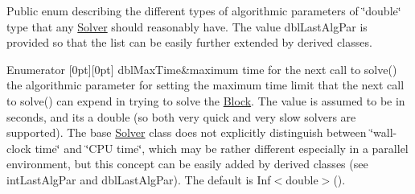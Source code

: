 Public enum describing the different types of algorithmic parameters of \char`\"{}double\char`\"{} type that any \mbox{\hyperlink{class_s_m_spp__di__unipi__it_1_1_solver}{Solver}} should reasonably have. The value dbl\+Last\+Alg\+Par is provided so that the list can be easily further extended by derived classes. \begin{DoxyEnumFields}{Enumerator}
[0pt][0pt]{}\mbox{\label{class_s_m_spp__di__unipi__it_1_1_solver_ace6215148d1e3c41a8844f6d692ee132acd77e71bf86e7d641a5e571a18efae5a}} 
dbl\+Max\+Time&maximum time for the next call to solve() the algorithmic parameter for setting the maximum time limit that the next call to solve() can expend in trying to solve the \mbox{\hyperlink{class_s_m_spp__di__unipi__it_1_1_block}{Block}}. The value is assumed to be in seconds, and it\textquotesingle{}s a double (so both very quick and very slow solvers are supported). The base \mbox{\hyperlink{class_s_m_spp__di__unipi__it_1_1_solver}{Solver}} class does not explicitly distinguish between \char`\"{}wall-\/clock time\char`\"{} and \char`\"{}\+C\+P\+U time\char`\"{}, which may be rather different especially in a parallel environment, but this concept can be easily added by derived classes (see int\+Last\+Alg\+Par and dbl\+Last\+Alg\+Par). The default is Inf$<$double$>$(). \\
\hline


\end{DoxyEnumFields}
